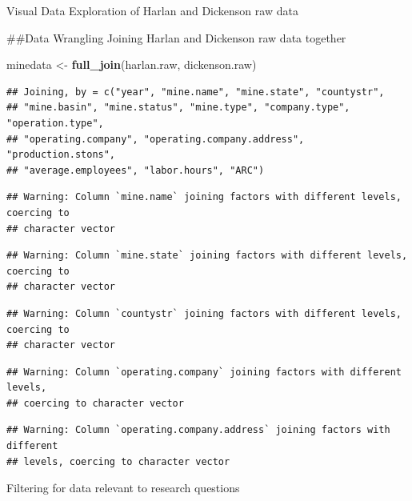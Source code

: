 \documentclass[12pt,]{article}
\newenvironment{Shaded}{\begin{snugshade}}{\end{snugshade}}
\newcommand{\KeywordTok}[1]{\textcolor[rgb]{0.13,0.29,0.53}{\textbf{#1}}}
\newcommand{\NormalTok}[1]{#1}
\newcommand{\StringTok}[1]{\textcolor[rgb]{0.31,0.60,0.02}{#1}}
\begin{document}
Visual Data Exploration of Harlan and Dickenson raw data

\#\#Data Wrangling Joining Harlan and Dickenson raw data together

\begin{Shaded}
\begin{Highlighting}[]
\NormalTok{minedata <-}\StringTok{ }\KeywordTok{full_join}\NormalTok{(harlan.raw, dickenson.raw)}
\end{Highlighting}
\end{Shaded}

\begin{verbatim}
## Joining, by = c("year", "mine.name", "mine.state", "countystr",
## "mine.basin", "mine.status", "mine.type", "company.type", "operation.type",
## "operating.company", "operating.company.address", "production.stons",
## "average.employees", "labor.hours", "ARC")
\end{verbatim}

\begin{verbatim}
## Warning: Column `mine.name` joining factors with different levels, coercing to
## character vector
\end{verbatim}

\begin{verbatim}
## Warning: Column `mine.state` joining factors with different levels, coercing to
## character vector
\end{verbatim}

\begin{verbatim}
## Warning: Column `countystr` joining factors with different levels, coercing to
## character vector
\end{verbatim}

\begin{verbatim}
## Warning: Column `operating.company` joining factors with different levels,
## coercing to character vector
\end{verbatim}

\begin{verbatim}
## Warning: Column `operating.company.address` joining factors with different
## levels, coercing to character vector
\end{verbatim}

Filtering for data relevant to research questions
\end{document}
